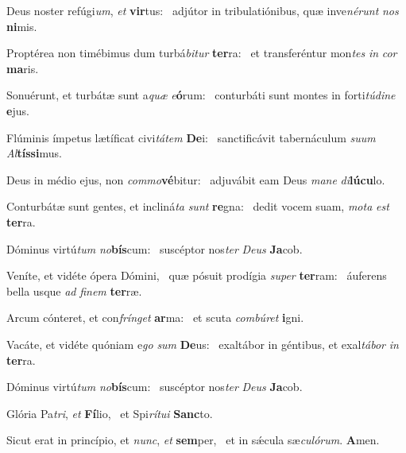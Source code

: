 \item Deus noster refúgi\textit{um}, \textit{et} \textbf{vir}tus:~\psstar{} adjútor in tribulatiónibus, quæ inve\textit{nérunt} \textit{nos} \textbf{ni}mis.
\item Proptérea non timébimus dum turbá\textit{bitur} \textbf{ter}ra:~\psstar{} et transferéntur mon\textit{tes} \textit{in} \textit{cor} \textbf{ma}ris.
\item Sonuérunt, et turbátæ sunt a\textit{quæ} \textit{e}\textbf{ó}rum:~\psstar{} conturbáti sunt montes in forti\textit{túdine} \textbf{e}jus.
\item Flúminis ímpetus lætíficat civi\textit{tátem} \textbf{De}i:~\psstar{} sanctificávit tabernáculum \textit{suum} \textit{Al}\textbf{tís}\textbf{si}mus.
\item Deus in médio ejus, non \textit{commo}\textbf{vé}bitur:~\psstar{} adjuvábit eam Deus \textit{mane} \textit{di}\textbf{lú}\textbf{cu}lo.
\item Conturbátæ sunt gentes, et incliná\textit{ta} \textit{sunt} \textbf{re}gna:~\psstar{} dedit vocem suam, \textit{mota} \textit{est} \textbf{ter}ra.
\item Dóminus virtú\textit{tum} \textit{no}\textbf{bís}\-cum:~\psstar{} suscéptor nos\textit{ter} \textit{Deus} \textbf{Ja}cob.
\item Veníte, et vidéte ópera Dómini,~\pscross{} quæ pósuit prodígia \textit{super} \textbf{ter}ram:~\psstar{} áuferens bella usque \textit{ad} \textit{finem} \textbf{ter}ræ.
\item Arcum cónteret, et con\textit{frínget} \textbf{ar}ma:~\psstar{} et scuta \textit{combúret} \textbf{i}gni.
\item Vacáte, et vidéte quóniam e\textit{go} \textit{sum} \textbf{De}us:~\psstar{} exaltábor in géntibus, et exal\textit{tábor} \textit{in} \textbf{ter}ra.
\item Dóminus virtú\textit{tum} \textit{no}\textbf{bís}\-cum:~\psstar{} suscéptor nos\textit{ter} \textit{Deus} \textbf{Ja}cob.
\item Glória Pa\textit{tri}, \textit{et} \textbf{Fí}lio,~\psstar{} et Spi\textit{rítui} \textbf{Sanc}to.
\item Sicut erat in princípio, et \textit{nunc}, \textit{et} \textbf{sem}per,~\psstar{} et in sǽcula sæ\textit{culórum}. \textbf{A}men.
